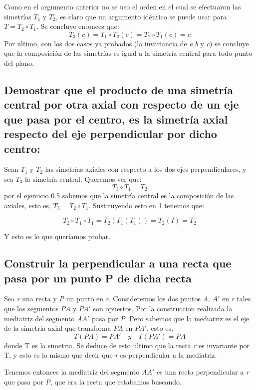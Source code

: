 \documentclass[12pt,a4paper]{article}
\begin{document}
Como en el argumento anterior no se uso el orden en el cual se efectuaron las simetrías \(T_1\) y \(T_2\), es claro que un argumento idéntico se puede usar para \(T = T_2 \circ T_1 \). Se concluye entonces que:
\[ T_3 (c) = T_1 \circ T_2 (c) = T_2 \circ T_1 (c) = c \]
Por ultimo, con los dos casos ya probados (la invariancia de \textit{a},\textit{b} y \textit{c}) se concluye que la composición de las simetrías es igual a la simetría central para todo punto del plano.

\subsection{Demostrar que el producto de una simetría central por otra axial con respecto de un eje que pasa por el centro, es la simetría axial respecto del eje perpendicular por dicho centro:}

Sean \(T_1\) y \(T_2\) las simetrías axiales con respecto a los dos ejes perpendiculares, y sea \(T_3\) la simetría central. Queremos ver que: 
\begin{equation}
T_3 \circ T_1  = T_2
\end{equation}
por el ejercicio 0.5 sabemos que la simetría central es la composición de las axiales, esto es, \(T_3 = T_2 \circ T_1\). Sustituyendo esto en 1 tenemos que:

\[T_2 \circ T_1 \circ T_1 = T_2(T_1(T_1)) = T_2(I) = T_2\]

Y esto es lo que queríamos probar.

\subsection{Construir la perpendicular a una recta que pasa por un punto P de dicha recta}

Sea \textit{r} una recta y \textit{P} un punto en \textit{r}. Consideremos los dos puntos \textit{A}, \(A'\)  en \textit{r} tales que los segmentos \(PA\) y \(PA'\) son opuestos. Por la construccion realizada la mediatriz del segmento \(AA'\) pasa por \textit{P}. Pero sabemos que la mediatriz es el eje de la simetria axial que transforma \(PA\) en \(PA'\), esto es, 
\[ T(PA) = PA'\quad y \quad T(PA') = PA \]
donde T es la simetria. Se deduce de esto ultimo que la recta \textit{r} es invariante por T, y esto es lo mismo que decir que \textit{r} es perpendicular a la mediatriz. 

Tenemos entonces la mediatriz del segmento \(AA'\) es una recta perpendicular a \textit{r} que pasa por \textit{P}, que era la recta que estabamos buscando.
\end{document}
